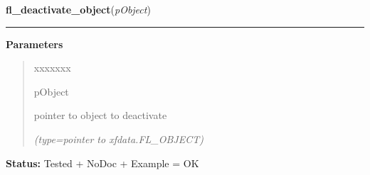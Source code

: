     \label{xformslib:library:fl_deactivate_object}

    \vspace{0.5ex}

\hspace{.8\funcindent}\begin{boxedminipage}{\funcwidth}

    \raggedright \textbf{fl\_deactivate\_object}(\textit{pObject})

    \vspace{-1.5ex}

    \rule{\textwidth}{0.5\fboxrule}
\setlength{\parskip}{2ex}
\setlength{\parskip}{1ex}
      \textbf{Parameters}
      \vspace{-1ex}

      \begin{quote}
        \begin{Ventry}{xxxxxxx}

          \item[pObject]

          pointer to object to deactivate

            {\it (type=pointer to xfdata.FL\_OBJECT)}

        \end{Ventry}

      \end{quote}

\textbf{Status:} Tested + NoDoc + Example = OK



    \end{boxedminipage}

    \label{xformslib:library:fl_object_is_active}

    \vspace{0.5ex}

